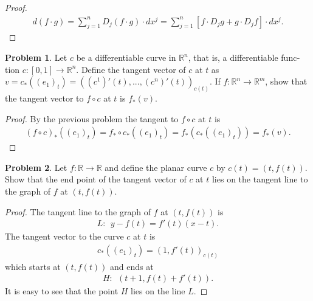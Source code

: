 \documentclass[20pt]{article}
\theoremstyle{plain}
\theoremstyle{definition}
\newtheorem*{problem}{Problem}
\newcommand{\reals}{\mathbb{R}}
\begin{document}
\begin{proof}
  \begin{align*}
    d(f \cdot g) =
    \sum_{j=1}^n D_j(f \cdot g) \cdot dx^j = 
    \sum_{j=1}^n [f \cdot D_jg + g \cdot  D_jf] \cdot dx^j.
  \end{align*}
\end{proof}



\begin{problem}{4.14}
  Let $c$ be a differentiable curve in $\reals^n$, that is, a differentiable func­tion 
  $c: [0,1] \to \reals^n$. Define the tangent vector of $c$ at $t$ as
  $v = c_*((e_1)_t) = ((c^1)'(t), ..., (c^n)'(t))_{c(t)}$.
  If $f: \reals^n \to \reals^m$, show that the tangent vector to $f \circ c$ at $t$ is $f_*(v)$.
\end{problem}

\begin{proof}
  By the previous problem the tangent to $f \circ c$ at $t$ is 
  \begin{align}
    (f \circ c)_*((e_1)_t) = f_* \circ c_*((e_1)_t) = f_*(c_*((e_1)_t)) = f_*(v).
  \end{align}
\end{proof}



\begin{problem}{4.15}
  Let $f: \reals \to \reals$ and define the planar curve $c$ by $c(t) = (t, f(t))$. 
  Show that the end point of the tangent vector of $c$ at $t$ lies on the 
  tangent line to the graph of $f$ at $(t,f(t))$.
\end{problem}

\begin{proof}
  The tangent line to the graph of $f$ at $(t, f(t))$ is 
  \begin{align*}
    L:\ \ y - f(t) = f'(t)(x - t).
  \end{align*}
  The tangent vector to the curve $c$ at $t$ is 
  \begin{align*}
    c_*((e_1)_t) = (1, f'(t))_{c(t)}
  \end{align*}
  which starts at $(t, f(t))$ and ends at 
  \begin{align*}
    H: \ \ (t+1, f(t) + f'(t)).
  \end{align*}
  It is easy to see that the point $H$ lies on the line $L$.
\end{proof}
\end{document}
